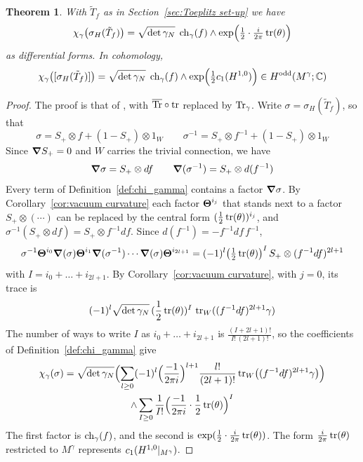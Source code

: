 \documentclass[11pt]{amsart}
\theoremstyle{plain}
\newtheorem{theorem}{Theorem}[section]
\theoremstyle{definition}
\theoremstyle{remark}
\begin{document}
\begin{theorem}\label{thm:Toeplitz character}
With $\tilde T_f$  as in Section~\ref{sec:Toeplitz set-up} we have
\[ \chi_\gamma\bigl(\sigma_H(\tilde T_f)\bigr)=\sqrt{\det\gamma_N}\;\operatorname{ch}_\gamma(f)\wedge\exp\Bigl(\tfrac12\cdot\tfrac{i}{2\pi}\operatorname{tr}(\theta)\Bigr)\]
as differential forms.
In cohomology,
\[ \chi_\gamma\bigl([\sigma_H(\tilde T_f)]\bigr)=\sqrt{\det\gamma_N}\;\operatorname{ch}_\gamma(f)\wedge\exp\Bigl(\tfrac12c_1(H^{1,0})\Bigr)\in H^{\mathrm{odd}}(M^\gamma;{\mathbb{C}})\]
\end{theorem}
\begin{proof}
The proof is that of \cite[Theorem~7.5]{GvE20}, with ${\overline{\mathrm{Tr}}}\circ\operatorname{tr}$ replaced by $\operatorname{Tr}_\gamma$.
Write $\sigma=\sigma_H(\tilde T_f)$, so that
\[ \sigma=S_+\otimes f+(1-S_+)\otimes 1_W\qquad \sigma^{-1}=S_+\otimes f^{-1}+(1-S_+)\otimes 1_W\]
Since $\boldsymbol{\nabla} S_+=0$ and  $W$ carries the trivial connection, we have
\[ \boldsymbol{\nabla}\sigma=S_+\otimes df\qquad \boldsymbol{\nabla}(\sigma^{-1})=S_+\otimes d(f^{-1})\]
Every term of Definition~\ref{def:chi_gamma} contains a factor $\boldsymbol{\nabla}\sigma$.
By Corollary~\ref{cor:vacuum curvature} each factor $\boldsymbol{\Theta}^{i_j}$ that stands next to a factor $S_+\otimes(\cdots)$ can be replaced by the central form $(\frac12\operatorname{tr}(\theta))^{i_j}$, and $\sigma^{-1}(S_+\otimes df)=S_+\otimes f^{-1}df$.
Since $d(f^{-1})=-f^{-1}df\,f^{-1}$,
\[ \sigma^{-1}\boldsymbol{\Theta}^{i_0}\boldsymbol{\nabla}(\sigma)\boldsymbol{\Theta}^{i_1}\boldsymbol{\nabla}(\sigma^{-1})\cdots\boldsymbol{\nabla}(\sigma)\boldsymbol{\Theta}^{i_{2l+1}}=(-1)^l\bigl(\tfrac12\operatorname{tr}(\theta)\bigr)^I\,S_+\otimes(f^{-1}df)^{2l+1}\]
with $I=i_0+\dots+i_{2l+1}$.
By Corollary~\ref{cor:vacuum curvature}, with $j=0$, its trace is 
\[(-1)^l\sqrt{\det\gamma_N}\,(\frac12\operatorname{tr}(\theta))^I\,\operatorname{tr}_W((f^{-1}df)^{2l+1}\gamma)\]
The number of ways to write $I$ as $i_0+\dots+i_{2l+1}$ is $\frac{(I+2l+1)!}{I!\,(2l+1)!}$, so the coefficients of Definition~\ref{def:chi_gamma} give
\begin{multline*}
\chi_\gamma(\sigma)=\sqrt{\det\gamma_N}\Bigl(\sum_{l\ge0}(-1)^l\Bigl(\frac{-1}{2\pi i}\Bigr)^{l+1}\frac{l!}{(2l+1)!}\operatorname{tr}_W\bigl((f^{-1}df)^{2l+1}\gamma\bigr)\Bigr)\\
\wedge\sum_{I\ge0}\frac{1}{I!}\Bigl(\frac{-1}{2\pi i}\cdot\frac12\operatorname{tr}(\theta)\Bigr)^I
\end{multline*}
The first factor is $\operatorname{ch}_\gamma(f)$, and the second is $\exp(\frac12\cdot\frac{i}{2\pi}\operatorname{tr}(\theta))$.
The form $\frac{i}{2\pi}\operatorname{tr}(\theta)$ restricted to $M^\gamma$ represents $c_1(H^{1,0}|_{M^\gamma})$.

\end{proof}
\end{document}
